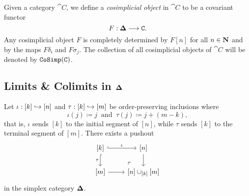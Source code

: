 \begin{definition}
\label{def:cosimp-obj}
Given a category \(\cat C\), we define a \emph{cosimplicial object} in
\(\cat C\) to be a covariant functor
\[
F: {\mathbf{\Delta}} \longrightarrow \texttt C.
\]
Any cosimplicial object \(F\) is completely determined by \(F [n]\) for all
\(n \in \mathbf{N}\) and by the maps \(F \delta_i\) and \(F \sigma_j\). The collection
of all cosimplicial objects of \(\cat C\) will be denoted by
\({\texttt{CoSimp}(\texttt C)}\).
\end{definition}

\subsection{Limits \& Colimits in \texorpdfstring{\({\mathbf{\Delta}}\)}{Delta}}

\begin{lemma}
\label{lem:splx-cat-pushout-injections}
Let \(\iota: [k] \hookrightarrow [n]\) and \(\tau: [k] \hookrightarrow [m]\) be order-preserving
inclusions where
\[
\iota(j) \coloneq j\ \text{ and }\ \tau(j) \coloneq j + (m - k),
\]
that is, \(\iota\) sends \([k]\) to the initial segment of \([n]\), while
\(\tau\) sends \([k]\) to the terminal segment of \([m]\). There exists a
pushout
\[
\begin{tikzcd}
{[k]} \ar[r, hook, "\iota"] \ar[d, hook, "\tau"']
\ar[rd, "\ulcorner", very near end, phantom]
&{[n]} \ar[d] \\
{[m]} \ar[r] &{[n] \cup_{[k]} [m]}
\end{tikzcd}
\]
in the simplex category \({\mathbf{\Delta}}\).
\end{lemma}

